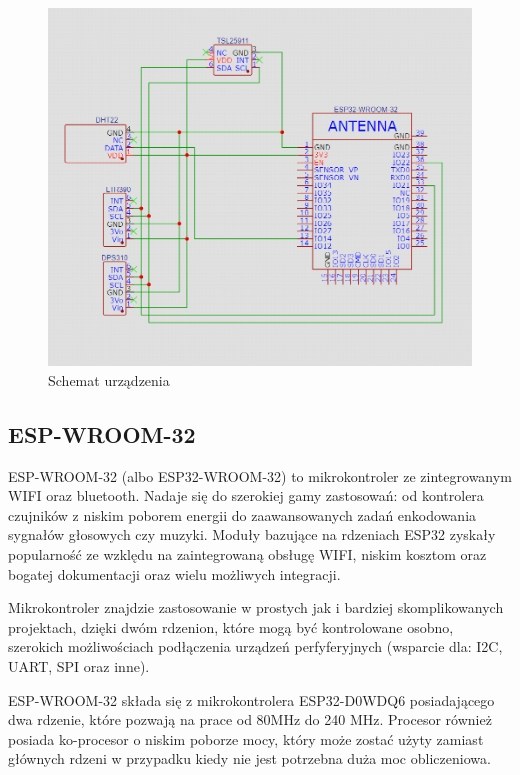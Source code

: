 \documentclass[12pt,a4paper]{article}
\begin{document}
\begin{figure}[H]
    \centering
    \includegraphics[width=\textwidth]{device-schematic.png}
    \caption{Schemat urządzenia}
    \label{device-schematic}
\end{figure}

\subsection{ESP-WROOM-32}
ESP-WROOM-32 (albo ESP32-WROOM-32) to mikrokontroler ze zintegrowanym WIFI oraz bluetooth. Nadaje się do szerokiej gamy zastosowań:
od kontrolera czujników z niskim poborem energii do zaawansowanych zadań enkodowania sygnałów głosowych czy muzyki. Moduły bazujące na rdzeniach ESP32 zyskały popularność ze wzklędu na zaintegrowaną obsługę WIFI, 
niskim kosztom oraz bogatej dokumentacji oraz wielu możliwych integracji.

Mikrokontroler znajdzie zastosowanie w prostych jak i bardziej skomplikowanych projektach, dzięki dwóm rdzenion, które mogą być kontrolowane osobno,
szerokich możliwościach podłączenia urządzeń perfyferyjnych (wsparcie dla: I2C, UART, SPI oraz inne).

ESP-WROOM-32 składa się z mikrokontrolera ESP32-D0WDQ6 posiadającego dwa rdzenie, które pozwają na prace od 80MHz do 240 MHz. Procesor również
posiada ko-procesor o niskim poborze mocy, który może zostać użyty zamiast głównych rdzeni w przypadku kiedy nie jest potrzebna duża moc obliczeniowa.
\end{document}
